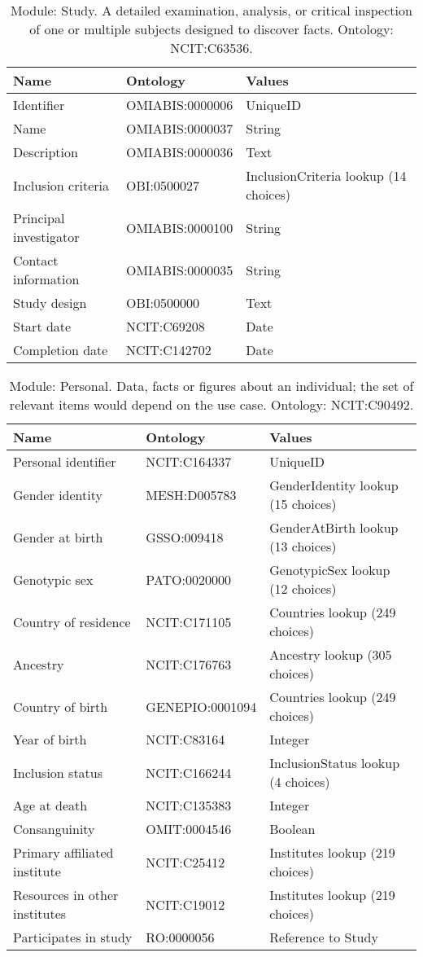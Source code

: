 \documentclass{article}
\begin{document}
\begin{table}[htb]
\begin{tabular}{lll}
Name & Ontology & Values \\
\hline
Identifier & OMIABIS:0000006 & UniqueID \\
Name & OMIABIS:0000037 & String \\
Description & OMIABIS:0000036 & Text \\
Inclusion criteria & OBI:0500027 & InclusionCriteria lookup (14 choices) \\
Principal investigator & OMIABIS:0000100 & String \\
Contact information & OMIABIS:0000035 & String \\
Study design & OBI:0500000 & Text \\
Start date & NCIT:C69208 & Date \\
Completion date & NCIT:C142702 & Date \\
\hline
\end{tabular}
\caption[Module: Study]{\label{table:table2} Module: Study. A detailed examination, analysis, or critical inspection of one or multiple subjects designed to discover facts. Ontology: NCIT:C63536. }
\end{table}

\begin{table}[htb]
\begin{tabular}{lll}
Name & Ontology & Values \\
\hline
Personal identifier & NCIT:C164337 & UniqueID \\
Gender identity & MESH:D005783 & GenderIdentity lookup (15 choices) \\
Gender at birth & GSSO:009418 & GenderAtBirth lookup (13 choices) \\
Genotypic sex & PATO:0020000 & GenotypicSex lookup (12 choices) \\
Country of residence & NCIT:C171105 & Countries lookup (249 choices) \\
Ancestry & NCIT:C176763 & Ancestry lookup (305 choices) \\
Country of birth & GENEPIO:0001094 & Countries lookup (249 choices) \\
Year of birth & NCIT:C83164 & Integer \\
Inclusion status & NCIT:C166244 & InclusionStatus lookup (4 choices) \\
Age at death & NCIT:C135383 & Integer \\
Consanguinity & OMIT:0004546 & Boolean \\
Primary affiliated institute & NCIT:C25412 & Institutes lookup (219 choices) \\
Resources in other institutes & NCIT:C19012 & Institutes lookup (219 choices) \\
Participates in study & RO:0000056 & Reference to Study \\
\hline
\end{tabular}
\caption[Module: Personal]{\label{table:table3} Module: Personal. Data, facts or figures about an individual; the set of relevant items would depend on the use case. Ontology: NCIT:C90492. }
\end{table}
\end{document}
